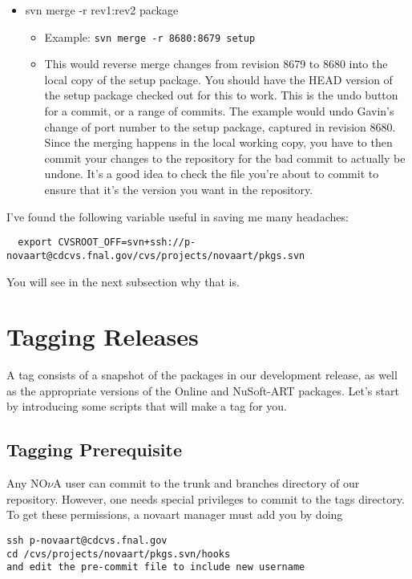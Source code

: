 \documentclass[letterpaper,10pt]{article}
\begin{document}
\begin{itemize}
\item svn merge -r rev1:rev2 package
  \begin{itemize}
  \item Example: \verb|svn merge -r 8680:8679 setup|
  \item This would reverse merge changes from revision 8679 to 8680 into the local copy of the setup package. You should have the HEAD version of the setup package checked out for this to work. This is the undo button for a commit, or a range of commits. The example would undo Gavin's change of port number to the setup package, captured in revision 8680. Since the merging happens in the local working copy, you have to then commit your changes to the repository for the bad commit to actually be undone. It's a good idea to check the file you're about to commit to ensure that it's the version you want in the repository.  
  \end{itemize}

\end{itemize}

\noindent
I've found the following variable useful in saving me many headaches:
\begin{verbatim}
  export CVSROOT_OFF=svn+ssh://p-novaart@cdcvs.fnal.gov/cvs/projects/novaart/pkgs.svn
\end{verbatim}
You will see in the next subsection why that is.



\section{Tagging Releases}
A tag consists of a snapshot of the packages in our development release, as well as the appropriate versions of the Online and NuSoft-ART packages. Let's start by introducing some scripts that will make a tag for you.

\subsection{Tagging Prerequisite}

Any NO$\nu$A user can commit to the trunk and branches directory of our repository.  However, one needs special privileges to commit to the tags directory.  To get these permissions, a novaart manager must add you by doing

\begin{verbatim}
ssh p-novaart@cdcvs.fnal.gov
cd /cvs/projects/novaart/pkgs.svn/hooks
and edit the pre-commit file to include new username
\end{verbatim}
\end{document}
